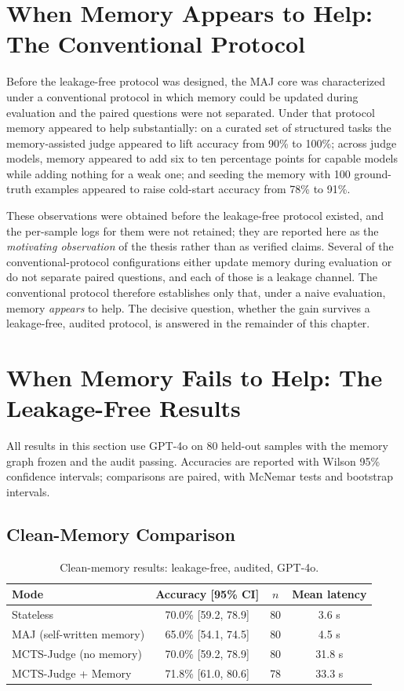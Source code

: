 \documentclass[14pt,a4paper]{extreport}
\begin{document}
\section{When Memory Appears to Help: The Conventional Protocol}

Before the leakage-free protocol was designed, the MAJ core was characterized under a conventional protocol in which memory could be updated during evaluation and the paired questions were not separated. Under that protocol memory appeared to help substantially: on a curated set of structured tasks the memory-assisted judge appeared to lift accuracy from 90\% to 100\%; across judge models, memory appeared to add six to ten percentage points for capable models while adding nothing for a weak one; and seeding the memory with 100 ground-truth examples appeared to raise cold-start accuracy from 78\% to 91\%.

These observations were obtained before the leakage-free protocol existed, and the per-sample logs for them were not retained; they are reported here as the \emph{motivating observation} of the thesis rather than as verified claims. Several of the conventional-protocol configurations either update memory during evaluation or do not separate paired questions, and each of those is a leakage channel. The conventional protocol therefore establishes only that, under a naive evaluation, memory \emph{appears} to help. The decisive question, whether the gain survives a leakage-free, audited protocol, is answered in the remainder of this chapter.

\section{When Memory Fails to Help: The Leakage-Free Results}

All results in this section use GPT-4o on 80 held-out samples with the memory graph frozen and the audit passing. Accuracies are reported with Wilson 95\% confidence intervals; comparisons are paired, with McNemar tests and bootstrap intervals.

\subsection{Clean-Memory Comparison}

\begin{table}[h]
\centering
\caption{Clean-memory results: leakage-free, audited, GPT-4o.}
\label{tab:clean}
\begin{tabular}{lccc}
\toprule
Mode & Accuracy [95\% CI] & $n$ & Mean latency \\
\midrule
Stateless & 70.0\% [59.2, 78.9] & 80 & 3.6 s \\
MAJ (self-written memory) & 65.0\% [54.1, 74.5] & 80 & 4.5 s \\
MCTS-Judge (no memory) & 70.0\% [59.2, 78.9] & 80 & 31.8 s \\
MCTS-Judge + Memory & 71.8\% [61.0, 80.6] & 78 & 33.3 s \\
\bottomrule
\end{tabular}
\end{table}
\end{document}
